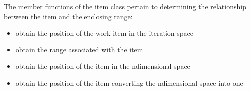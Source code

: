\documentclass[letterpaper,10pt,english]{sphinxmanual}
\begin{document}
The member functions of the item class pertain to determining the
relationship between the item and the enclosing range:
\begin{itemize}
\item {} 
 \textendash{} obtain the position of the work item in the iteration
space

\item {} 
 \textendash{} obtain the range associated with the item

\item {} 
 \textendash{} obtain the position of the item in the n\sphinxhyphen{}dimensional
space

\item {} 
 \textendash{} obtain the position of the item converting the
n\sphinxhyphen{}dimensional space into one

\end{itemize}
\end{document}
